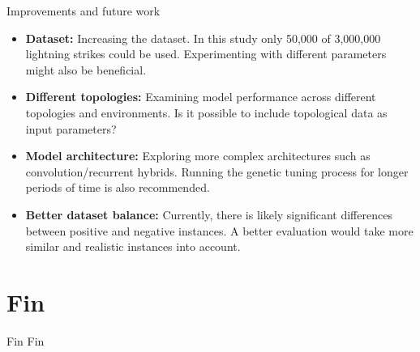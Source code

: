 \documentclass[10pt]{beamer}
\begin{document}
\begin{frame}{Improvements and future work}
\begin{itemize}
	\item \textbf{Dataset:} Increasing the dataset. In this study only 50,000 of 3,000,000 lightning strikes could be used. Experimenting with different parameters might also be beneficial.
	\item \textbf{Different topologies:} Examining model performance across different topologies and environments. Is it possible to include topological data as input parameters?
	\item \textbf{Model architecture:} Exploring more complex architectures such as convolution/recurrent hybrids. Running the genetic tuning process for longer periods of time is also recommended.
	\item \textbf{Better dataset balance:} Currently, there is likely significant differences between positive and negative instances. A better evaluation would take more similar and realistic instances into account.
\end{itemize}
\end{frame}


\section{Fin}


\begin{frame}{Fin}
\centering
Fin
\end{frame}
\end{document}
